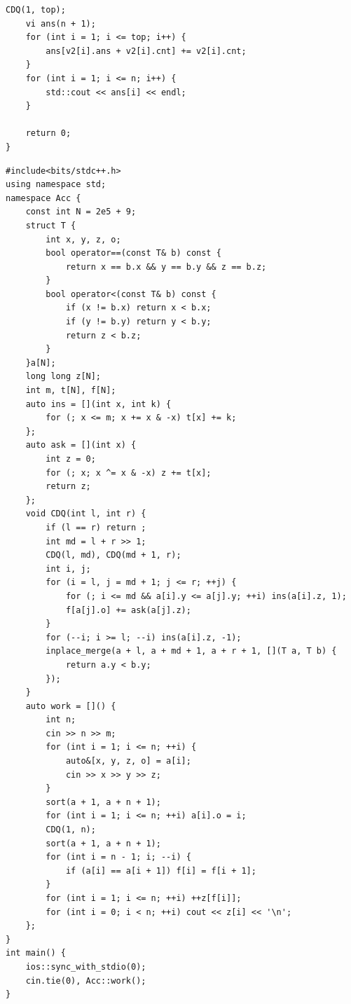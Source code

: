 \documentclass[UTF8, a4paper, titlepage, twoside]{ctexart}
\begin{document}
\begin{lstlisting}[style=cpp]
    CDQ(1, top);
    vi ans(n + 1);
    for (int i = 1; i <= top; i++) {
        ans[v2[i].ans + v2[i].cnt] += v2[i].cnt;
    }
    for (int i = 1; i <= n; i++) {
        std::cout << ans[i] << endl;
    }

    return 0;
}
\end{lstlisting}

\begin{lstlisting}[style = cpp]
#include<bits/stdc++.h>
using namespace std;
namespace Acc {
    const int N = 2e5 + 9;
    struct T {
        int x, y, z, o;
        bool operator==(const T& b) const {
            return x == b.x && y == b.y && z == b.z;
        }
        bool operator<(const T& b) const {
            if (x != b.x) return x < b.x;
            if (y != b.y) return y < b.y;
            return z < b.z;
        }
    }a[N];
    long long z[N];
    int m, t[N], f[N];
    auto ins = [](int x, int k) {
        for (; x <= m; x += x & -x) t[x] += k;
    };
    auto ask = [](int x) {
        int z = 0;
        for (; x; x ^= x & -x) z += t[x];
        return z;
    };
    void CDQ(int l, int r) {
        if (l == r) return ;
        int md = l + r >> 1;
        CDQ(l, md), CDQ(md + 1, r);
        int i, j;
        for (i = l, j = md + 1; j <= r; ++j) {
            for (; i <= md && a[i].y <= a[j].y; ++i) ins(a[i].z, 1);
            f[a[j].o] += ask(a[j].z);
        }
        for (--i; i >= l; --i) ins(a[i].z, -1);
        inplace_merge(a + l, a + md + 1, a + r + 1, [](T a, T b) {
            return a.y < b.y;
        });
    }
    auto work = []() {
        int n;
        cin >> n >> m;
        for (int i = 1; i <= n; ++i) {
            auto&[x, y, z, o] = a[i];
            cin >> x >> y >> z;
        }
        sort(a + 1, a + n + 1);
        for (int i = 1; i <= n; ++i) a[i].o = i;
        CDQ(1, n);
        sort(a + 1, a + n + 1);
        for (int i = n - 1; i; --i) {
            if (a[i] == a[i + 1]) f[i] = f[i + 1];
        }
        for (int i = 1; i <= n; ++i) ++z[f[i]];
        for (int i = 0; i < n; ++i) cout << z[i] << '\n';
    };
}
int main() {
    ios::sync_with_stdio(0);
    cin.tie(0), Acc::work();
}
\end{lstlisting}
\end{document}
